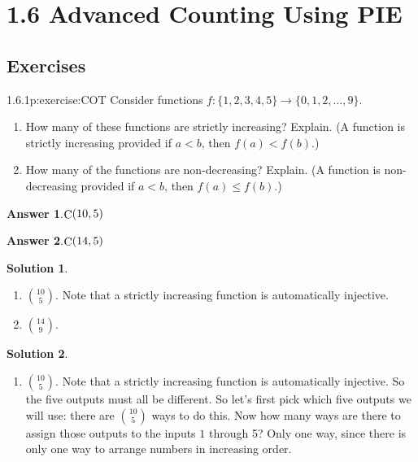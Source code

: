 \documentclass[twoside,11pt,]{book}
\newcommand{\blocktitlefont}{\relax}
\numberwithin{equation}{chapter}
\newcommand{\lt}{<}
\begin{document}
\section*{1.6 Advanced Counting Using PIE}
\subsection*{Exercises}
\begin{divisionsolution}{1.6.1}{}{p:exercise:COT}%
Consider functions \(f:\{1,2,3,4,5\} \to \{0,1,2,\ldots,9\}\text{.}\)%
\begin{enumerate}[label=(\alph*)]
\item{}How many of these functions are strictly increasing? Explain. (A function is strictly increasing provided if \(a \lt b\text{,}\) then \(f(a) \lt f(b)\text{.}\))%
\item{}How many of the functions are non-decreasing? Explain. (A function is non-decreasing provided if \(a \lt b\text{,}\) then \(f(a) \le f(b)\text{.}\))%
\end{enumerate}
%
\par\smallskip%
\noindent\textbf{\blocktitlefont Answer 1}.\quad{}\(\mathop{\rm C}\nolimits\!\left(10,5\right)\)%
\par\smallskip%
\noindent\textbf{\blocktitlefont Answer 2}.\quad{}\(\mathop{\rm C}\nolimits\!\left(14,5\right)\)%
\par\smallskip%
\noindent\textbf{\blocktitlefont Solution 1}.\quad{}%
\begin{enumerate}[label=(\alph*)]
\item{}\({10 \choose 5}\text{.}\) Note that a strictly increasing function is automatically injective.%
\item{}\({14 \choose 9}\text{.}\)%
\end{enumerate}
%
\par\smallskip%
\noindent\textbf{\blocktitlefont Solution 2}.\quad{}%
\begin{enumerate}[label=(\alph*)]
\item{}\({10 \choose 5}\text{.}\) Note that a strictly increasing function is automatically injective. So the five outputs must all be different. So let's first pick which five outputs we will use: there are \({10 \choose 5}\) ways to do this. Now how many ways are there to assign those outputs to the inputs \(1\) through 5? Only one way, since there is only one way to arrange numbers in increasing order.%

\end{enumerate}
\end{divisionsolution}
\end{document}
